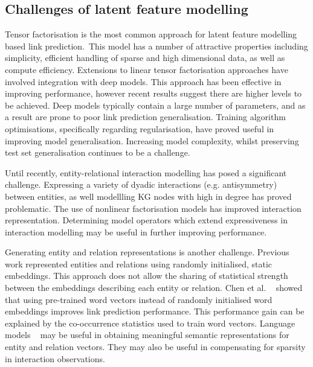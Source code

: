 \subsection{Challenges of latent feature modelling} 

Tensor factorisation is the most common approach for latent feature modelling based link prediction.\ This model has a number of attractive properties including simplicity, efficient handling of sparse and high dimensional data, as well as compute efficiency. Extensions to linear tensor factorisation approaches have involved integration with deep models. This approach has been effective in improving performance, however recent results suggest there are higher levels to be achieved. Deep models typically contain a large number of parameters, and as a result are prone to poor link prediction generalisation. Training algorithm optimisations, specifically regarding regularisation, have proved useful in improving model generalisation. Increasing model complexity, whilst preserving test set generalisation continues to be a challenge. \par

\noindent Until recently, entity-relational interaction modelling has posed a significant challenge. Expressing a variety of dyadic interactions (e.g. antisymmetry) between entities, as well modellling KG nodes with high in degree has proved problematic. The use of nonlinear factorisation models has improved interaction representation. Determining model operators which extend expressiveness in interaction modelling may be useful in further improving performance.\par

\noindent Generating entity and relation representations is another challenge. Previous work represented entities and relations using randomly initialised, static embeddings. This approach does not allow the sharing of statistical strength between the embeddings describing each entity or relation. Chen et al. \unskip~\citep{socher2013reasoning} showed that using pre-trained word vectors instead of randomly initialised word embeddings improves link prediction performance. This performance gain can be explained by the co-occurrence statistics used to train word vectors. Language models \unskip~\citep{ bojanowski2016enriching, vaswani2017attention} may be useful in obtaining meaningful semantic representations for entity and relation vectors. They may also be useful in compensating for sparsity in interaction observations. \par

